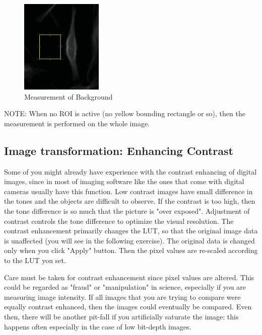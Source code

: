 \begin{indentexercise}{1}
\begin{figure}[htbp]
\begin{center}
\includegraphics[height=4.5cm]{fig/CMCIBasicCourse201102-img35.jpg}
\caption{Measurement of Background}
\label{fig:img35}
\end{center}
\end{figure}

\end{indentexercise}

NOTE: When no ROI is active (no yellow bounding rectangle or so),
then the measurement is performed on the whole image.

\subsection{Image transformation: Enhancing Contrast}
\label{subsec:enhancecontrast}
Some of you might already have experience with the contrast enhancing of
digital images, since in most of imaging software like the ones that
come with digital cameras usually have this function. Low contrast images
have small difference in the tones and the objects are difficult to observe.
If the contrast is too high, then the tone difference is so much that
the picture is "over exposed".
Adjustment of contrast controls the tone difference to optimize the
visual resolution. The contrast enhancement primarily changes the LUT,
so that the original image data is unaffected (you will see in the
following exercise). The original data is changed only when you click
"Apply" button. Then the pixel values
are re-scaled according to the LUT you set.



Care must be taken for contrast enhancement since pixel values are
altered. This could be regarded as
"fraud" or
"manipulation" in science, especially if
you are measuring image intensity. If all images that you are trying to
compare were equally contrast enhanced,
then the images could eventually be compared. Even then, there will be another
pit-fall if you artificially saturate the image: this happens often
especially in the case of low bit-depth images. 

